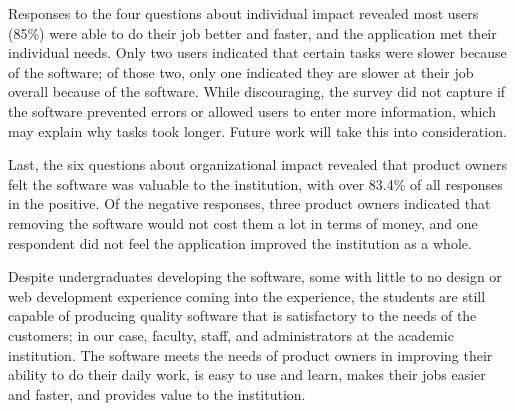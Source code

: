 Responses to the four questions about individual impact revealed most users (85\%) were able to do their job better and faster, and the application met their individual needs. Only two users indicated that certain tasks were slower because of the software; of those two, only one indicated they are slower at their job overall because of the software. While discouraging, the survey did not capture if the software prevented errors or allowed users to enter more information, which may explain why tasks took longer. Future work will take this into consideration. %

Last, the six questions about organizational impact revealed that product owners felt the software was valuable to the institution, with over 83.4\% of all responses in the positive. Of the negative responses, three product owners indicated that removing the software would not cost them a lot in terms of money, and one respondent did not feel the application improved the institution as a whole.  

Despite undergraduates developing the software, some with little to no design or web development experience coming into the experience, the students are still capable of producing quality software that is satisfactory to the needs of the customers; in our case, faculty, staff, and administrators at the academic institution. The software meets the needs of product owners in improving their ability to do their daily work, is easy to use and learn, makes their jobs easier and faster, and provides value to the institution. 



